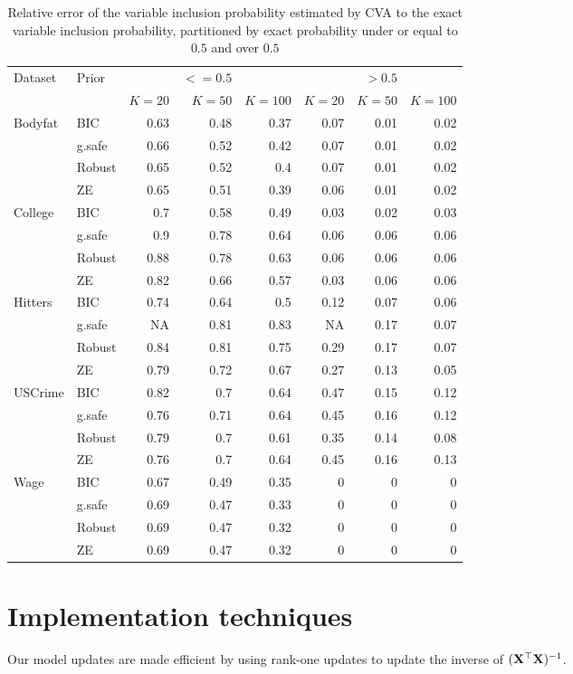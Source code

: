 \begin{table}
\begin{tabular}{|ll|rrr|rrr|}
	\hline
	Dataset & Prior & & $<=0.5$ & & & $>0.5$ &\\
	& & $K = 20$ & $K = 50$ & $K = 100$ & $K = 20$ & $K = 50$ & $K = 100$ \\
	\hline
	Bodyfat&BIC&0.63&0.48&0.37&0.07&0.01&0.02\\
	&g.safe&0.66&0.52&0.42&0.07&0.01&0.02\\
	&Robust&0.65&0.52&0.4&0.07&0.01&0.02\\
	&ZE&0.65&0.51&0.39&0.06&0.01&0.02\\
	College&BIC&0.7&0.58&0.49&0.03&0.02&0.03\\
	&g.safe&0.9&0.78&0.64&0.06&0.06&0.06\\
	&Robust&0.88&0.78&0.63&0.06&0.06&0.06\\
	&ZE&0.82&0.66&0.57&0.03&0.06&0.06\\
	Hitters&BIC&0.74&0.64&0.5&0.12&0.07&0.06\\
	&g.safe&NA&0.81&0.83&NA&0.17&0.07\\
	&Robust&0.84&0.81&0.75&0.29&0.17&0.07\\
	&ZE&0.79&0.72&0.67&0.27&0.13&0.05\\
	USCrime&BIC&0.82&0.7&0.64&0.47&0.15&0.12\\
	&g.safe&0.76&0.71&0.64&0.45&0.16&0.12\\
	&Robust&0.79&0.7&0.61&0.35&0.14&0.08\\
	&ZE&0.76&0.7&0.64&0.45&0.16&0.13\\
	Wage&BIC&0.67&0.49&0.35&0&0&0\\
	&g.safe&0.69&0.47&0.33&0&0&0\\
	&Robust&0.69&0.47&0.32&0&0&0\\
	&ZE&0.69&0.47&0.32&0&0&0\\
	\hline
\end{tabular}
\label{tab:variable_inclusion_rel_error}
\caption{Relative error of the variable inclusion probability estimated by CVA to the
					exact variable inclusion probability, partitioned by exact probability under or equal to $0.5$ and
					over $0.5$}
\end{table}

\section{Implementation techniques}
Our model updates are made efficient by using rank-one updates to update the inverse of $({\bf X}^\top {\bf X})^{-1}$.

